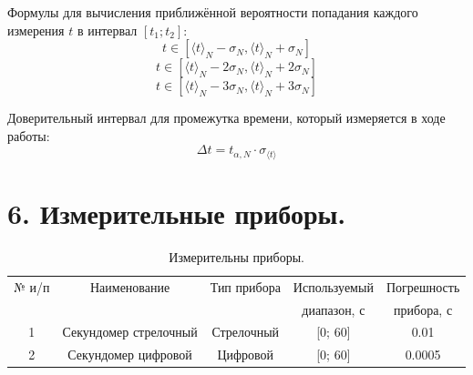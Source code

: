 \documentclass[14pt]{extreport}
\begin{document}
Формулы для вычисления приближённой вероятности попадания каждого измерения $t$ в интервал $[t_1; t_2]$:
\begin{equation*}\label{f9}
    t \in [\langle t \rangle_N - \sigma_N, \langle t \rangle_N + \sigma_N]
\end{equation*}
\begin{equation}\label{f10}
    t \in [\langle t \rangle_N - 2\sigma_N, \langle t \rangle_N + 2\sigma_N]
\end{equation}
\begin{equation*}\label{f11}
    t \in [\langle t \rangle_N - 3\sigma_N, \langle t \rangle_N + 3\sigma_N]
\end{equation*}

Доверительный интервал для промежутка времени, который измеряется в ходе работы:
\begin{equation}\label{f12}
    \Delta t = t_{\alpha, N} \cdot \sigma_{\langle t \rangle}
\end{equation}

\section*{6. Измерительные приборы.}
\begin{table}[H]\label{t1}
\caption{Измерительны приборы.}
\centering
\begin{tabular}{|c|c|c|c|c|}
\hline
 № и/п & Наименование & Тип прибора & Используемый & Погрешность \\ 
 & & & диапазон, с & прибора, с \\ \hline
 1 & Секундомер стрелочный & Стрелочный & [0; 60] & 0.01 \\ \hline
 2 & Секундомер цифровой & Цифровой & [0; 60] & 0.0005 \\ \hline
 
\end{tabular}
\end{table}
\end{document}
